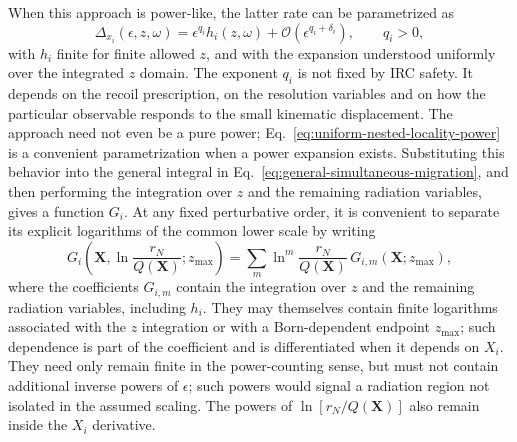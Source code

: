 \documentclass[11pt]{article}
\newcommand{\rn}{r_N}
\begin{document}
When this approach is power-like, the latter rate can be parametrized as
\begin{equation}
\Delta_{x_i}(\epsilon,z,\omega)
=
\epsilon^{q_i}
 h_i(z,\omega)
+\mathcal O(\epsilon^{q_i+\delta_i}),
\qquad q_i>0,
\label{eq:uniform-nested-locality-power}
\end{equation}
with \(h_i\) finite for finite allowed \(z\), and with the expansion understood uniformly over the integrated
\(z\) domain. The exponent \(q_i\) is not fixed by IRC safety. It depends on
the recoil prescription, on the resolution variables and on how the particular observable responds to the
small kinematic displacement. The approach need not even be a pure power; Eq.~\eqref{eq:uniform-nested-locality-power}
is a convenient parametrization when a power expansion exists. Substituting this behavior into the general
integral in Eq.~\eqref{eq:general-simultaneous-migration}, and then performing the integration over \(z\) and
the remaining radiation variables, gives a function \(G_i\). At any fixed perturbative order, it is convenient
to separate its explicit logarithms of the common lower scale by writing
\begin{equation}
G_i\!\left(\mathbf X,\ln\frac{\rn}{Q(\mathbf X)};z_{\max}\right)
=
\sum_m
\ln^m\!\frac{\rn}{Q(\mathbf X)}\,
G_{i,m}(\mathbf X;z_{\max}),
\label{eq:Gi-log-decomposition}
\end{equation}
where the coefficients \(G_{i,m}\) contain the integration over \(z\) and the remaining radiation variables,
including \(h_i\). They may themselves contain finite logarithms associated with the \(z\) integration or
with a Born-dependent endpoint \(z_{\max}\); such dependence is part of the coefficient and is differentiated
when it depends on \(X_i\). They need only remain finite in the power-counting sense, but must not contain
additional inverse powers of \(\epsilon\); such powers would signal a radiation region not isolated in the
assumed scaling. The powers of \(\ln[\rn/Q(\mathbf X)]\) also remain inside the \(X_i\) derivative.
\end{document}
